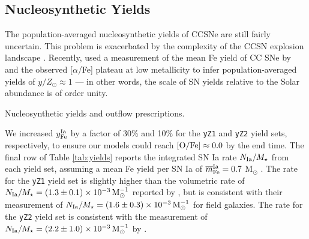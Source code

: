 \documentclass[twocolumn,twocolappendix,linenumbers]{aastex631}
\newcommand{\aFe}{[$\alpha$/Fe]\xspace}
\begin{document}
\subsection{Nucleosynthetic Yields}
\label{sec:yields}

The population-averaged nucleosynthetic yields of CCSNe are still fairly uncertain. This problem is exacerbated by the complexity of the CCSN explosion landscape \citep{sukhbold_core-collapse_2016}. Recently, \citet{weinberg_scale_2024} used a measurement of the mean Fe yield of CC SNe by \citet{rodriguez_iron_2023} and the observed \aFe plateau at low metallicity to infer population-averaged yields of $y/Z_\odot\approx1$ --- in other words, the scale of SN yields relative to the Solar abundance is of order unity.

\begin{table}
    \centering
    \caption{Nucleosynthetic yields and outflow prescriptions.}
    
    \label{tab:yields}
\end{table}

We increased $y_{\rm Fe}^{\rm Ia}$ by a factor of 30\% and 10\% for the {\tt yZ1} and {\tt yZ2} yield sets, respectively, to ensure our models could reach ${\rm [O/Fe]}\approx0.0$ by the end time. The final row of Table \ref{tab:yields} reports the integrated SN Ia rate $N_{\rm Ia}/M_\star$ from each yield set, assuming a mean Fe yield per SN Ia of $\overline m_{\rm Fe}^{\rm Ia}=0.7$ M$_\odot$ \citep{mazzali_common_2007,howell_effect_2009}. The rate for the {\tt yZ1} yield set is slightly higher than the volumetric rate of $N_{\rm Ia}/M_\star=(1.3\pm0.1)\times10^{-3}\,{\rm M}_\odot^{-1}$ reported by \citet{maoz_star_2017}, but is consistent with their measurement of $N_{\rm Ia}/M_\star=(1.6\pm0.3)\times10^{-3}\,{\rm M}_\odot^{-1}$ for field galaxies. The rate for the {\tt yZ2} yield set is consistent with the measurement of $N_{\rm Ia}/M_\star=(2.2\pm1.0)\times10^{-3}\,{\rm M}_\odot^{-1}$ by \citet{maoz_type-ia_2012}.
\end{document}
